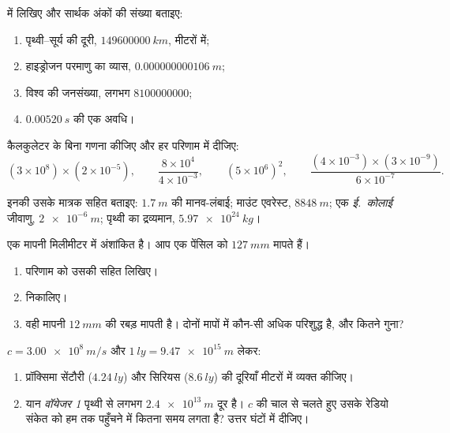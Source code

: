 \begin{exercise}[$\star$]\label{exo:g10:orders-of-magnitude:2}
 में लिखिए और सार्थक अंकों की संख्या
बताइए:
\begin{enumerate}
  \item पृथ्वी--सूर्य की दूरी, $\qty{149600000}{km}$, मीटरों में;
  \item हाइड्रोजन परमाणु का व्यास, $\qty{0.000000000106}{m}$;
  \item विश्व की जनसंख्या, लगभग $\num{8100000000}$;
  \item $\qty{0.00520}{s}$ की एक अवधि।
\end{enumerate}
\end{exercise}

\begin{exercise}[$\star$]\label{exo:g10:orders-of-magnitude:3}
कैलकुलेटर के बिना गणना कीजिए और हर परिणाम  में
दीजिए:
\[
(3\times10^{8})\times(2\times10^{-5}), \qquad
\frac{8\times10^{4}}{4\times10^{-3}}, \qquad
(5\times10^{6})^{2}, \qquad
\frac{(4\times10^{-3})\times(3\times10^{-9})}{6\times10^{-7}} .
\]
\end{exercise}

\begin{exercise}[$\star$]\label{exo:g10:orders-of-magnitude:4}
इनकी  उसके मात्रक सहित बताइए: $\qty{1.7}{m}$
की मानव-लंबाई; माउंट एवरेस्ट, $\qty{8848}{m}$; एक \emph{ई.~कोलाई} जीवाणु,
$\qty{2e-6}{m}$; पृथ्वी का द्रव्यमान, $\qty{5.97e24}{kg}$।
\end{exercise}

\begin{exercise}[$\star$]\label{exo:g10:orders-of-magnitude:5}
एक मापनी मिलीमीटर में अंशांकित है। आप एक पेंसिल को $\qty{127}{mm}$ मापते हैं।
\begin{enumerate}
  \item परिणाम को उसकी  सहित लिखिए।
  \item {} निकालिए।
  \item वही मापनी $\qty{12}{mm}$ की रबड़ मापती है। दोनों मापों में कौन-सी अधिक
        परिशुद्ध है, और कितने गुना?
\end{enumerate}
\end{exercise}

\begin{exercise}[$\star\star$]\label{exo:g10:orders-of-magnitude:6}
$c = \qty{3.00e8}{m/s}$ और $\qty{1}{ly} = \qty{9.47e15}{m}$ लेकर:
\begin{enumerate}
  \item प्रॉक्सिमा सेंटौरी ($\qty{4.24}{ly}$) और सिरियस ($\qty{8.6}{ly}$) की दूरियाँ
        मीटरों में व्यक्त कीजिए।
  \item यान \emph{वॉयेजर 1} पृथ्वी से लगभग $\qty{2.4e13}{m}$ दूर है। $c$ की
        चाल से चलते हुए उसके रेडियो संकेत को हम तक पहुँचने में कितना
        समय लगता है? उत्तर घंटों में दीजिए।
\end{enumerate}
\end{exercise}

